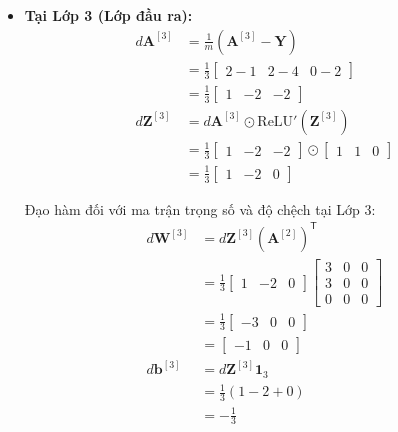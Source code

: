 \begin{itemize}
    \item \textbf{Tại Lớp 3 (Lớp đầu ra):}
    \begin{align*}
    d\mathbf{A}^{[3]} &= \frac{1}{m}\left(\mathbf{A}^{[3]} - \mathbf{Y}\right) \\
    &= \frac{1}{3}\begin{bmatrix} 2-1 & 2-4 & 0-2 \end{bmatrix} \\
    &= \frac{1}{3}\begin{bmatrix} 1 & -2 & -2 \end{bmatrix} \\
    d\mathbf{Z}^{[3]} &= d\mathbf{A}^{[3]} \odot \text{ReLU}'\!\left(\mathbf{Z}^{[3]}\right) \\
    &= \frac{1}{3}\begin{bmatrix} 1 & -2 & -2 \end{bmatrix} \odot \begin{bmatrix} 1 & 1 & 0 \end{bmatrix} \\
    &= \frac{1}{3}\begin{bmatrix} 1 & -2 & 0 \end{bmatrix}
    \end{align*}

    Đạo hàm đối với ma trận trọng số và độ chệch tại Lớp 3:
    \begin{align*}
    d\mathbf{W}^{[3]} &= d\mathbf{Z}^{[3]}\left(\mathbf{A}^{[2]}\right)^{\mathsf{T}} \\
    &= \frac{1}{3}\begin{bmatrix} 1 & -2 & 0 \end{bmatrix}\begin{bmatrix} 3 & 0 & 0 \\ 3 & 0 & 0 \\ 0 & 0 & 0 \end{bmatrix} \\
    &= \frac{1}{3}\begin{bmatrix} -3 & 0 & 0 \end{bmatrix} \\
    &= \begin{bmatrix} -1 & 0 & 0 \end{bmatrix} \\
    d\mathbf{b}^{[3]} &= d\mathbf{Z}^{[3]}\mathbf{1}_3 \\
    &= \frac{1}{3}\left(1 - 2 + 0\right) \\
    &= -\frac{1}{3}
    \end{align*}


\end{itemize}
